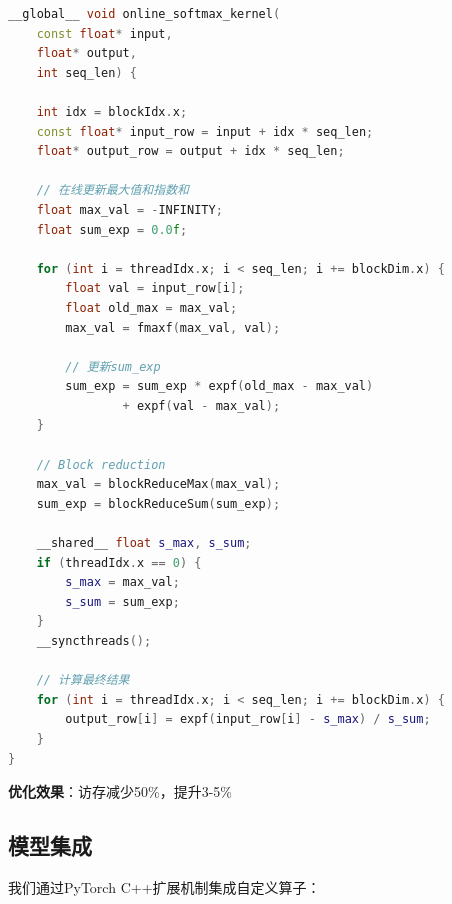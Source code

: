 \documentclass[12pt,a4paper]{article}
\begin{document}
\begin{lstlisting}[language=C++,caption=Online Softmax Kernel]
__global__ void online_softmax_kernel(
    const float* input,
    float* output,
    int seq_len) {
    
    int idx = blockIdx.x;
    const float* input_row = input + idx * seq_len;
    float* output_row = output + idx * seq_len;
    
    // 在线更新最大值和指数和
    float max_val = -INFINITY;
    float sum_exp = 0.0f;
    
    for (int i = threadIdx.x; i < seq_len; i += blockDim.x) {
        float val = input_row[i];
        float old_max = max_val;
        max_val = fmaxf(max_val, val);
        
        // 更新sum_exp
        sum_exp = sum_exp * expf(old_max - max_val) 
                + expf(val - max_val);
    }
    
    // Block reduction
    max_val = blockReduceMax(max_val);
    sum_exp = blockReduceSum(sum_exp);
    
    __shared__ float s_max, s_sum;
    if (threadIdx.x == 0) {
        s_max = max_val;
        s_sum = sum_exp;
    }
    __syncthreads();
    
    // 计算最终结果
    for (int i = threadIdx.x; i < seq_len; i += blockDim.x) {
        output_row[i] = expf(input_row[i] - s_max) / s_sum;
    }
}
\end{lstlisting}

\textbf{优化效果}：访存减少50\%，提升3-5\%

\subsection{模型集成}

我们通过PyTorch C++扩展机制集成自定义算子：
\end{document}
